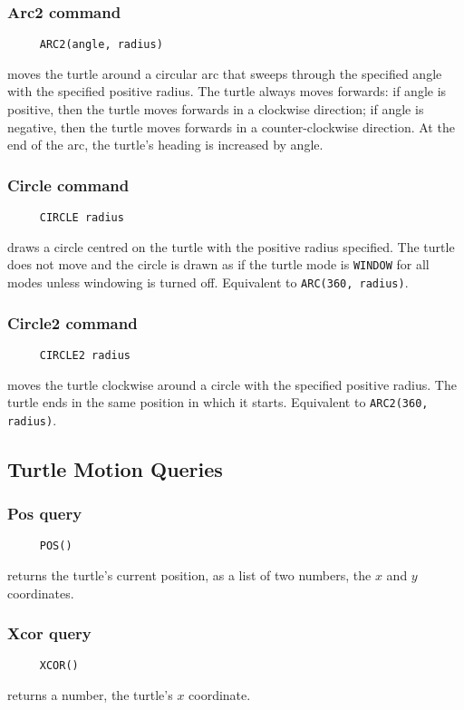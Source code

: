 \subsubsection*{Arc2 command}
\begin{verbatim}
     ARC2(angle, radius)
\end{verbatim}
moves the turtle around a circular arc that sweeps through the
specified angle with the specified positive radius.  The turtle always
moves forwards: if angle is positive, then the turtle moves forwards
in a clockwise direction; if angle is negative, then the turtle moves
forwards in a counter-clockwise direction.  At the end of the arc, the
turtle's heading is increased by angle.

\subsubsection*{Circle command}
\begin{verbatim}
     CIRCLE radius
\end{verbatim}
draws a circle centred on the turtle with the positive radius
specified.  The turtle does not move and the circle is drawn as if the
turtle mode is \texttt{WINDOW} for all modes unless windowing is
turned off.  Equivalent to \texttt{ARC(360, radius)}.

\subsubsection*{Circle2 command}
\begin{verbatim}
     CIRCLE2 radius
\end{verbatim}
moves the turtle clockwise around a circle with the specified positive
radius.  The turtle ends in the same position in which it starts.
Equivalent to \texttt{ARC2(360, radius)}.


\subsection{Turtle Motion Queries}

\subsubsection*{Pos query}
\begin{verbatim}
     POS()
\end{verbatim}
returns the turtle's current position, as a list of two numbers, the
$x$ and $y$ coordinates.

\subsubsection*{Xcor query}
\begin{verbatim}
     XCOR()
\end{verbatim}
returns a number, the turtle's $x$ coordinate.

